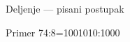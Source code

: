 
\begin{frame}[label=05-s053]{Deljenje — pisani postupak}
\fontsize{10}{12}\selectfont\setlength{\parskip}{1pt}

Primer 74:8=1001010:1000
\begin{center}\end{center}
\end{frame}
